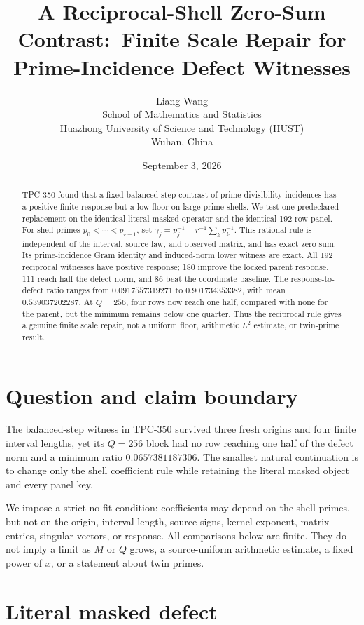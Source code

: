 \documentclass[10pt]{article}
\title{A Reciprocal-Shell Zero-Sum Contrast:\
       Finite Scale Repair for Prime-Incidence Defect Witnesses}
\author{Liang Wang\\
School of Mathematics and Statistics\\
Huazhong University of Science and Technology (HUST)\\
Wuhan, China}
\date{September 3, 2026}
\begin{document}
\maketitle

\begin{abstract}
TPC-350 found that a fixed balanced-step contrast of prime-divisibility
incidences has a positive finite response but a low floor on large prime
shells.  We test one predeclared replacement on the identical literal masked
operator and the identical 192-row panel.  For shell primes
$p_0<\cdots<p_{r-1}$, set
$\gamma_j=p_j^{-1}-r^{-1}\sum_kp_k^{-1}$.  This rational rule is independent
of the interval, source law, and observed matrix, and has exact zero sum.  Its
prime-incidence Gram identity and induced-norm lower witness are exact.  All
192 reciprocal witnesses have positive response; 180 improve the locked
parent response, 111 reach half the defect norm, and 86 beat the coordinate
baseline.  The response-to-defect ratio ranges from $0.0917557319271$ to
$0.901734353382$, with mean $0.539037202287$.  At $Q=256$, four rows now reach
one half, compared with none for the parent, but the minimum remains below
one quarter.  Thus the reciprocal rule gives a genuine finite scale repair,
not a uniform floor, arithmetic $L^2$ estimate, or twin-prime result.
\end{abstract}

\section{Question and claim boundary}

The balanced-step witness in TPC-350 survived three fresh origins and four
finite interval lengths, yet its $Q=256$ block had no row reaching one half of
the defect norm and a minimum ratio $0.0657381187306$.  The smallest natural
continuation is to change only the shell coefficient rule while retaining the
literal masked object and every panel key.

We impose a strict no-fit condition: coefficients may depend on the shell
primes, but not on the origin, interval length, source signs, kernel exponent,
matrix entries, singular vectors, or response.  All comparisons below are
finite.  They do not imply a limit as $M$ or $Q$ grows, a source-uniform
arithmetic estimate, a fixed power of $x$, or a statement about twin primes.

\section{Literal masked defect}
\end{document}
